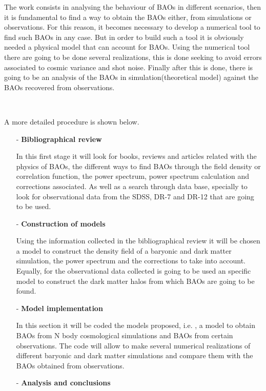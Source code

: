 \documentclass[a4,useAMS,usenatbib,usegraphicx,12pt]{article}
\begin{document}
The work consists in analysing the behaviour of BAOs in different scenarios, then it is fundamental
to find a way to obtain the BAOs either, from simulations or observations. For this reason, 
it becomes necessary to develop a numerical tool to find such BAOs in any case. But in order to 
build such a tool it is obviously needed a physical model that can account for BAOs. 
Using the numerical tool there are going to be done several realizations, this is done seeking to avoid errors
associated to cosmic variance and shot noise. Finally after this is done, there is going to be an 
analysis of the BAOs in simulation(theoretical model) against the BAOs recovered from observations.

\

A more detailed procedure is shown below.

\begin{itemize}

\item[-] \textbf{ Bibliographical review }
	
In this first stage it will look for books, reviews and articles related with the physics of 
BAOs, the different ways to find BAOs through the field density or correlation function, the 
power spectrum, power spectrum calculation and corrections associated. As well as a search 
through data base, specially to look for observational data  from the SDSS, DR-7 and DR-12 
that are going to be used.

\item[-] \textbf{ Construction of models } 

Using the information collected in the bibliographical review
it will be chosen a model to construct the density field of a baryonic  and  dark matter simulation,
the power spectrum and the corrections to take into account. Equally, for the observational
data collected is going to be used an specific model to construct the dark matter halos
from which  BAOs are going to be found.

\item[-] \textbf{ Model implementation } 

In this section it will be coded the models proposed, i.e. ,
a model to obtain BAOs from N body cosmological simulations and BAOs from certain observations.  
The code will allow to make several numerical realizations of different baryonic  and  dark matter
simulations and compare them with the BAOs obtained from observations. 

\item[-] \textbf{ Analysis and conclusions } 


\end{itemize}
\end{document}
